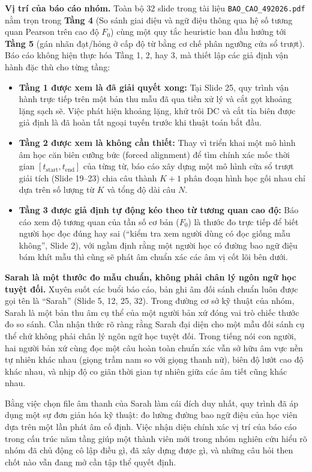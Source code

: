 \documentclass[11pt,a4paper]{article}
\begin{document}
\textbf{Vị trí của báo cáo nhóm.} Toàn bộ 32 slide trong tài liệu \texttt{BAO\_CAO\_492026.pdf} nằm trọn trong \textbf{Tầng 4} (So sánh giai điệu và ngữ điệu thông qua hệ số tương quan Pearson trên cao độ $F_0$) cùng một quy tắc heuristic ban đầu hướng tới \textbf{Tầng 5} (gán nhãn đạt/hỏng ở cấp độ từ bằng cơ chế phân ngưỡng cửa sổ trượt). Báo cáo không hiện thực hóa Tầng 1, 2, hay 3, mà thiết lập các giả định vận hành đặc thù cho từng tầng:
\begin{itemize}
    \item \textbf{Tầng 1 được xem là đã giải quyết xong:} Tại Slide 25, quy trình vận hành trực tiếp trên một bản thu mẫu đã qua tiền xử lý và cắt gọt khoảng lặng sạch sẽ. Việc phát hiện khoảng lặng, khử trôi DC và cắt tỉa biên được giả định là đã hoàn tất ngoại tuyến trước khi thuật toán bắt đầu.
    \item \textbf{Tầng 2 được xem là không cần thiết:} Thay vì triển khai một mô hình âm học căn biên cưỡng bức (forced alignment) để tìm chính xác mốc thời gian $[t_{\text{start}}, t_{\text{end}}]$ của từng từ, báo cáo xây dựng một mô hình cửa sổ trượt giải tích (Slide 19--23) chia câu thành $K+1$ phân đoạn hình học gối nhau chỉ dựa trên số lượng từ $K$ và tổng độ dài câu $N$.
    \item \textbf{Tầng 3 được giả định tự động kéo theo từ tương quan cao độ:} Báo cáo xem độ tương quan của tần số cơ bản ($F_0$) là thước đo trực tiếp để biết người học đọc đúng hay sai (``kiểm tra xem người dùng có đọc giống mẫu không'', Slide 2), với ngầm định rằng một người học có đường bao ngữ điệu bám khít mẫu thì cũng sẽ phát âm chuẩn xác các âm vị cốt lõi bên dưới.
\end{itemize}

\textbf{Sarah là một thước đo mẫu chuẩn, không phải chân lý ngôn ngữ học tuyệt đối.} Xuyên suốt các buổi báo cáo, bản ghi âm đối sánh chuẩn luôn được gọi tên là ``Sarah'' (Slide 5, 12, 25, 32). Trong đường cơ sở kỹ thuật của nhóm, Sarah là một bản thu âm cụ thể của một người bản xứ đóng vai trò chiếc thước đo so sánh. Cần nhận thức rõ ràng rằng Sarah đại diện cho một mẫu đối sánh cụ thể chứ không phải chân lý ngôn ngữ học tuyệt đối. Trong tiếng nói con người, hai người bản xứ cùng đọc một câu hoàn toàn chuẩn xác vẫn sở hữu âm vực nền tự nhiên khác nhau (giọng trầm nam so với giọng thanh nữ), biên độ lướt cao độ khác nhau, và nhịp độ co giãn thời gian tự nhiên giữa các âm tiết cũng khác nhau.

Bằng việc chọn file âm thanh của Sarah làm cái đích duy nhất, quy trình đã áp dụng một sự đơn giản hóa kỹ thuật: đo lường đường bao ngữ điệu của học viên dựa trên một lần phát âm cố định. Việc nhận diện chính xác vị trí của báo cáo trong cấu trúc năm tầng giúp một thành viên mới trong nhóm nghiên cứu hiểu rõ nhóm đã chủ động cô lập điều gì, đã xây dựng được gì, và những câu hỏi then chốt nào vẫn đang mở cần tập thể quyết định.
\end{document}
